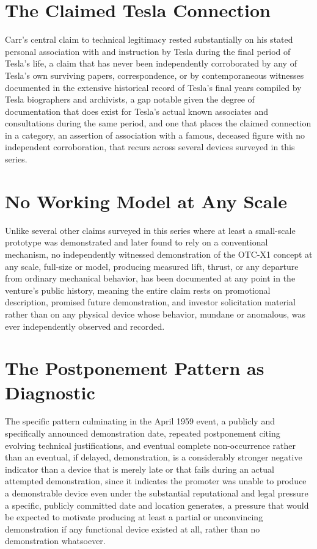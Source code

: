 \documentclass[11pt]{article}
\begin{document}
\section{The Claimed Tesla Connection}

Carr's central claim to technical legitimacy rested substantially on his stated personal association with and instruction by Tesla during the final period of Tesla's life, a claim that has never been independently corroborated by any of Tesla's own surviving papers, correspondence, or by contemporaneous witnesses documented in the extensive historical record of Tesla's final years compiled by Tesla biographers and archivists, a gap notable given the degree of documentation that does exist for Tesla's actual known associates and consultations during the same period, and one that places the claimed connection in a category, an assertion of association with a famous, deceased figure with no independent corroboration, that recurs across several devices surveyed in this series.

\section{No Working Model at Any Scale}

Unlike several other claims surveyed in this series where at least a small-scale prototype was demonstrated and later found to rely on a conventional mechanism, no independently witnessed demonstration of the OTC-X1 concept at any scale, full-size or model, producing measured lift, thrust, or any departure from ordinary mechanical behavior, has been documented at any point in the venture's public history, meaning the entire claim rests on promotional description, promised future demonstration, and investor solicitation material rather than on any physical device whose behavior, mundane or anomalous, was ever independently observed and recorded.

\section{The Postponement Pattern as Diagnostic}

The specific pattern culminating in the April 1959 event, a publicly and specifically announced demonstration date, repeated postponement citing evolving technical justifications, and eventual complete non-occurrence rather than an eventual, if delayed, demonstration, is a considerably stronger negative indicator than a device that is merely late or that fails during an actual attempted demonstration, since it indicates the promoter was unable to produce a demonstrable device even under the substantial reputational and legal pressure a specific, publicly committed date and location generates, a pressure that would be expected to motivate producing at least a partial or unconvincing demonstration if any functional device existed at all, rather than no demonstration whatsoever.
\end{document}
